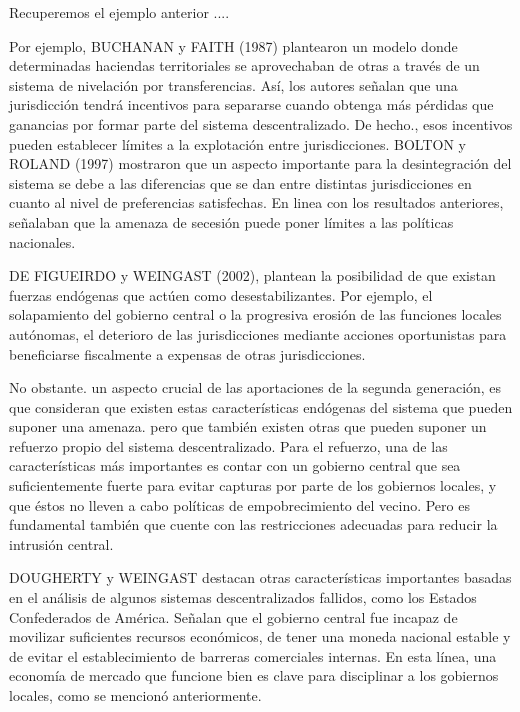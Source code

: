 \documentclass[10pt,a4paper]{article}
\begin{document}
Recuperemos el ejemplo anterior ....

Por ejemplo, BUCHANAN y FAITH (1987) plantearon un modelo donde determinadas haciendas territoriales se aprovechaban de otras a través de un sistema de nivelación por transferencias. Así, los autores señalan que una jurisdicción tendrá incentivos para separarse cuando obtenga más pérdidas que ganancias por formar parte del sistema descentralizado. De hecho., esos incentivos pueden establecer límites a la explotación entre jurisdicciones. BOLTON y ROLAND (1997) mostraron que un aspecto importante para la desintegración del sistema se debe a las diferencias que se dan entre distintas jurisdicciones en cuanto al nivel de preferencias satisfechas. En linea con los resultados anteriores, señalaban que la amenaza de secesión puede poner límites a las políticas nacionales. 

DE FIGUEIRDO y WEINGAST (2002), plantean la posibilidad de que existan fuerzas endógenas que actúen como desestabilizantes. Por ejemplo, el solapamiento del gobierno central o la progresiva erosión de las funciones locales autónomas, el deterioro de las jurisdicciones mediante acciones oportunistas para beneficiarse fiscalmente a expensas de otras jurisdicciones.

No obstante. un aspecto crucial de las aportaciones de la segunda generación, es que consideran que existen estas características endógenas del sistema que pueden suponer una amenaza. pero que también existen otras que pueden suponer un refuerzo propio del sistema descentralizado. Para el refuerzo, una de las características más importantes es contar con un gobierno central que sea suficientemente fuerte para evitar capturas por parte de los gobiernos locales, y que éstos no lleven a cabo políticas de empobrecimiento del vecino. Pero es fundamental también que cuente con las restricciones adecuadas para reducir la intrusión central.

DOUGHERTY y WEINGAST destacan otras características importantes basadas en el análisis de algunos sistemas descentralizados fallidos, como los Estados Confederados de América. Señalan que el gobierno central fue incapaz de movilizar suficientes recursos económicos, de tener una moneda nacional estable y de evitar el establecimiento de barreras comerciales internas. En esta línea, una economía de mercado que funcione bien es clave para disciplinar a los gobiernos locales, como se mencionó anteriormente.
\end{document}
